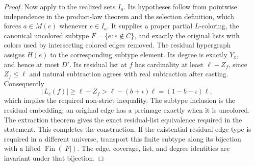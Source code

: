 \begin{proof}
Now apply  to the realized sets
$I_a$. Its hypotheses follow from pointwise independence in the product-law
theorem and the selection definition, which forces $a\in M(e)$ whenever
$e\in I_a$. It supplies a proper partial $L$-coloring, the canonical
uncolored subtype $F=\{e:e\notin C\}$, and exactly the original lists
with colors used by intersecting colored edges removed. The residual
hypergraph assigns $H(e)$ to the corresponding subtype element. Its degree
is exactly $Y_x$, and hence at most $D'$. Its residual list at $f$ has
cardinality at least $\ell-Z_f$, since $Z_f\le\ell$ and natural
subtraction agrees with real subtraction after casting. Consequently
\[
|L_c(f)|\ge\ell-Z_f>\ell-(b+\iota)\ell=(1-b-\iota)\ell,
\]
which implies the required non-strict inequality. The subtype inclusion
is the residual embedding; an original edge has a preimage exactly when
it is uncolored. The extraction theorem gives the exact residual-list
equivalence required in the statement. This completes the construction.
If the existential residual edge type is required in a different universe,
transport this finite subtype along its bijection with a lifted
$\operatorname{Fin}(|F|)$. The edge, coverage, list, and degree identities
are invariant under that bijection.
\end{proof}
